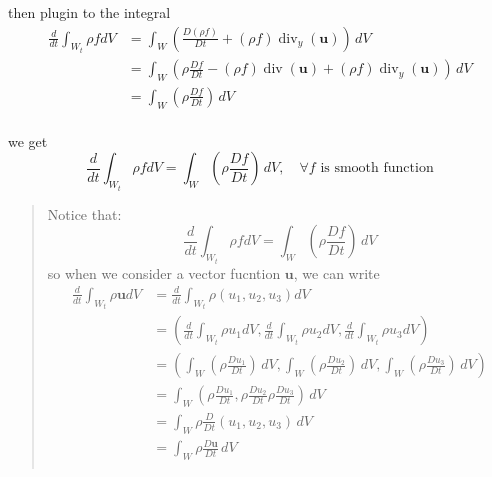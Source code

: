 then plugin to the integral
\begin{equation}
\begin{aligned}
\frac{d}{dt}\int_{W_t} \rho f dV
&= \int_W \left(
\frac{D(\rho f)}{D t} + (\rho f) \operatorname{div}_y (\textbf{u})
\right)\,dV\\
&= \int_W \left(
\rho \frac{Df}{Dt} -  (\rho f) \operatorname{div}( \textbf{u}) + (\rho f) \operatorname{div}_y (\textbf{u})
\right)\,dV\\
&= \int_W \left( \rho \frac{Df}{Dt}	\right)\,dV\\
\end{aligned}
\end{equation}


we get
\begin{equation}
\frac{d}{dt}\int_{W_t} \rho f dV
= \int_W \left( \rho \frac{Df}{Dt}	\right)\,dV,\quad\text{$\forall f$ is smooth function}
\end{equation}


\begin{quote}
	Notice that:
\begin{equation}
\frac{d}{dt}\int_{W_t} \rho f dV
= \int_W \left( \rho \frac{Df}{Dt}	\right)\,dV
\end{equation}
so when we consider a vector fucntion $\textbf{u}$, we can write
\begin{equation}
\begin{aligned}
\frac{d}{dt}\int_{W_t} \rho \textbf{u} dV
&= \frac{d}{dt}\int_{W_t} \rho (u_1,u_2,u_3) dV\\
&= \left(\frac{d}{dt}\int_{W_t} \rho u_1 dV, \frac{d}{dt}\int_{W_t} \rho u_2 dV,\frac{d}{dt}\int_{W_t} \rho u_3 dV\right)\\
&= \left(
\int_W \left( \rho \frac{Du_1}{Dt}	\right)\,dV,
\int_W \left( \rho \frac{Du_2}{Dt}	\right)\,dV,
\int_W \left( \rho \frac{Du_3}{Dt}	\right)\,dV
\right)\\
&= \int_W \left(
\rho \frac{Du_1}{Dt},
\rho \frac{Du_2}{Dt}
\rho \frac{Du_3}{Dt}
\right)\,dV\\
&= \int_W \rho \frac{D}{Dt}\left(u_1,u_2,u_3\right)\,dV\\
&= \int_W \rho \frac{D\textbf{u}}{Dt}\,dV\\
\end{aligned}
\end{equation}



\end{quote}

